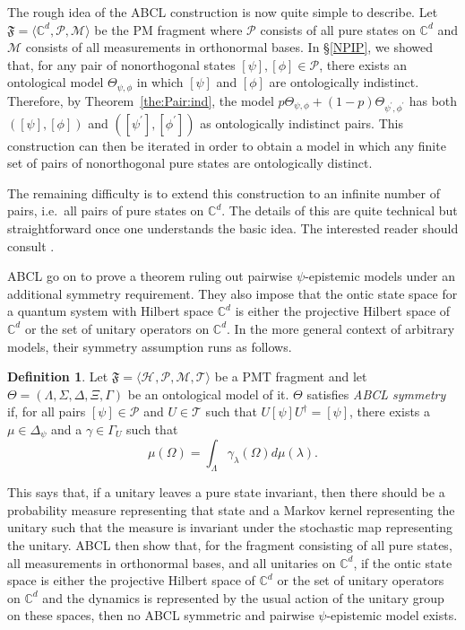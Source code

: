 \documentclass[DIV=calc,paper=a4,fontsize=11pt,twocolumn]{scrartcl} %
\theoremstyle{definition}
\newtheorem{definition}{Definition}[section]
\theoremstyle{plain}
\newcommand{\Proj}[1]{\ensuremath{\left [ #1 \right ]}}
\newcommand{\Hilb}[1][]{\ensuremath{\mathcal{H}_{#1}}}
\begin{document}
The rough idea of the ABCL construction is now quite simple to
describe.  Let $\mathfrak{F} = \langle \mathbb{C}^d, \mathcal{P},
\mathcal{M} \rangle$ be the PM fragment where $\mathcal{P}$ consists
of all pure states on $\mathbb{C}^d$ and $\mathcal{M}$ consists of all
measurements in orthonormal bases.  In \S\ref{NPIP}, we showed that,
for any pair of nonorthogonal states $\Proj{\psi}, \Proj{\phi} \in
\mathcal{P}$, there exists an ontological model $\Theta_{\psi,\phi}$ in
which $\Proj{\psi}$ and $\Proj{\phi}$ are ontologically indistinct.
Therefore, by Theorem~\ref{the:Pair:ind}, the model $p \Theta_{\psi,\phi}
+ (1-p) \Theta_{\psi^{\prime},\phi^{\prime}}$ has both $\left (
\Proj{\psi},\Proj{\phi} \right )$ and $\left ( \Proj{\psi^{\prime}},
\Proj{\phi^{\prime}}\right )$ as ontologically indistinct pairs.
This construction can then be iterated in order to obtain a model in
which any finite set of pairs of nonorthogonal pure states are
ontologically distinct.

The remaining difficulty is to extend this construction to an infinite
number of pairs, i.e.\ all pairs of pure states on $\mathbb{C}^d$.
The details of this are quite technical but straightforward once one
understands the basic idea.  The interested reader should consult
\cite{Aaronson2013}.

ABCL go on to prove a theorem ruling out pairwise $\psi$-epistemic
models under an additional symmetry requirement.  They also impose
that the ontic state space for a quantum system with Hilbert space
$\mathbb{C}^d$ is either the projective Hilbert space of
$\mathbb{C}^d$ or the set of unitary operators on $\mathbb{C}^d$.  In
the more general context of arbitrary models, their symmetry
assumption runs as follows.
\begin{definition}
Let $\mathfrak{F} = \langle \Hilb, \mathcal{P}, \mathcal{M},
\mathcal{T} \rangle$ be a PMT fragment and let $\Theta = (\Lambda,
\Sigma, \Delta, \Xi, \Gamma)$ be an ontological model of it.  $\Theta$
satisfies \emph{ABCL symmetry} if, for all pairs $\Proj{\psi} \in
\mathcal{P}$ and $U \in \mathcal{T}$ such that $U \Proj{\psi}
U^{\dagger} = \Proj{\psi}$, there exists a $\mu \in \Delta_{\psi}$
and a $\gamma \in \Gamma_{U}$ such that
\begin{equation}
\mu(\Omega) = \int_{\Lambda} \gamma_{\lambda}(\Omega) d \mu(\lambda).
\end{equation}
\end{definition}
This says that, if a unitary leaves a pure state invariant, then there
should be a probability measure representing that state and a Markov
kernel representing the unitary such that the measure is invariant
under the stochastic map representing the unitary.  ABCL then show
that, for the fragment consisting of all pure states, all measurements
in orthonormal bases, and all unitaries on $\mathbb{C}^d$, if the
ontic state space is either the projective Hilbert space of
$\mathbb{C}^d$ or the set of unitary operators on $\mathbb{C}^d$ and
the dynamics is represented by the usual action of the unitary group
on these spaces, then no ABCL symmetric and pairwise $\psi$-epistemic
model exists.
\end{document}
